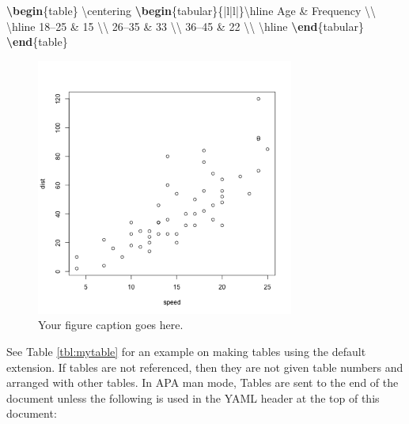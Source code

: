 \documentclass[man,longtable,noextraspace,floatsintext]{apa6}
\newenvironment{Shaded}{}{}
\newcommand{\ExtensionTok}[1]{#1}
\newcommand{\FunctionTok}[1]{\textcolor[rgb]{0.02,0.16,0.49}{#1}}
\newcommand{\KeywordTok}[1]{\textcolor[rgb]{0.00,0.44,0.13}{\textbf{#1}}}
\newcommand{\NormalTok}[1]{#1}
\newcommand{\OperatorTok}[1]{\textcolor[rgb]{0.40,0.40,0.40}{#1}}
\begin{document}
\begin{Shaded}
\begin{Highlighting}[]
\KeywordTok{\textbackslash{}begin}\NormalTok{\{}\ExtensionTok{table}\NormalTok{\}}
\FunctionTok{\textbackslash{}centering}
\KeywordTok{\textbackslash{}begin}\NormalTok{\{}\ExtensionTok{tabular}\NormalTok{\}\{|l|l|\}}\FunctionTok{\textbackslash{}hline}
\NormalTok{Age }\OperatorTok{&}\NormalTok{ Frequency }\FunctionTok{\textbackslash{}\textbackslash{}} \FunctionTok{\textbackslash{}hline}
\NormalTok{18--25  }\OperatorTok{&}\NormalTok{ 15 }\FunctionTok{\textbackslash{}\textbackslash{}}
\NormalTok{26--35  }\OperatorTok{&}\NormalTok{ 33 }\FunctionTok{\textbackslash{}\textbackslash{}}
\NormalTok{36--45  }\OperatorTok{&}\NormalTok{ 22 }\FunctionTok{\textbackslash{}\textbackslash{}} \FunctionTok{\textbackslash{}hline}
\KeywordTok{\textbackslash{}end}\NormalTok{\{}\ExtensionTok{tabular}\NormalTok{\}}
\KeywordTok{\textbackslash{}end}\NormalTok{\{}\ExtensionTok{table}\NormalTok{\}}
\end{Highlighting}
\end{Shaded}

\begin{figure}
\hypertarget{fig:myplot}{%
\centering
\includegraphics[width=3.333in,height=3.333in]{plot.png}
\caption{Your figure caption goes here.}\label{fig:myplot}
}
\end{figure}

See Table \ref{tbl:mytable} for an example on making tables using the
default extension. If tables are not referenced, then they are not given
table numbers and arranged with other tables. In APA man mode, Tables
are sent to the end of the document unless the following is used in the
YAML header at the top of this document:
\end{document}
